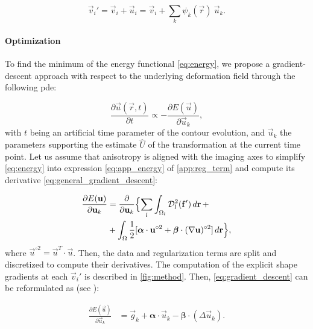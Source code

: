   \begin{equation}
  \vec{v}_i' = \vec{v}_i + \vec{u}_i = \vec{v}_i + \sum_k \psi_k(\vec{r}) \: \vec{u}_k.
  \label{eq:nodes_tfm}
  \end{equation}


\paragraph*{Optimization}
\label{sec:gradient_descent}
To find the minimum of the energy functional \eqref{eq:energy},
  we propose a gradient-descent approach with respect to the underlying
  deformation field through the following \gls*{pde}:

  \begin{equation}
  \frac{\partial \vec{u}(\vec{r},t)}{\partial t} \propto - \frac{\partial E(\vec{u})}{\partial \vec{u}_k},
  \label{eq:general_gradient_descent}
  \end{equation}
%
  with $t$ being an artificial time parameter of the contour
  evolution, and $\vec{u}_k$ the parameters supporting the estimate
  $\hat{U}$ of the transformation at the current time point.
Let us assume that anisotropy is aligned with the imaging axes to simplify
  \eqref{eq:energy} into expression \eqref{eq:app_energy} of \ref{app:reg_term}
  and compute its derivative \eqref{eq:general_gradient_descent}:

  \begin{align}
  \frac{\partial E(\vec{u})}{\partial \vec{u}_k} &=
  \frac{ \partial }{\partial \vec{u}_k} \Big\{
  \underset{l}{\sum} \int_{\Omega_l} \mdist{f'}{l} \,d\vec{r} \, + \notag\\
  &+ \int_{\Omega} \frac12 [ \boldsymbol{\alpha} \cdot \vec{u}^{\circ2}
  + \boldsymbol{\beta} \cdot (\nabla \vec{u})^{\circ2} ] \,d\vec{r}
  \Big\},
  \label{eq:gradient_descent}
  \end{align}
%
  where $\vec{u}^{\circ2} = \vec{u}^T \cdot \vec{u}$.
Then, the data and regularization terms are split and discretized to compute their
  derivatives.
The computation of the explicit shape gradients at each $\vec{v}_i'$ is described in \autoref{fig:method}.
Then, \eqref{eq:gradient_descent} can be reformulated as (see ):

  \begin{align}
  \frac{\partial E(\vec{u})}{\partial \vec{u}_k} &=
  \vec{g}_k  + \boldsymbol{\alpha} \cdot \vec{u}_k - \boldsymbol{\beta} \cdot (\Delta \vec{u}_k).
  \label{eq:final_gradient}
  \end{align}

